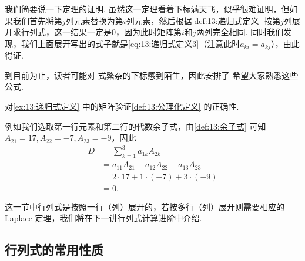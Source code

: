 我们简要说一下定理的证明. 虽然这一定理看着下标满天飞，似乎很难证明，但如果我们首先将第$j$列元素替换为第$i$列元素，然后根据\autoref{def:13:递归式定义} 按第$j$列展开求行列式，这一结果一定是0，因为此时矩阵第$i$和$j$两列完全相同. 同时我们发现，我们上面展开写出的式子就是\autoref{eq:13:递归式定义3}（注意此时$a_{ki}=a_{kj}$），由此得证.

到目前为止，读者可能对 式繁杂的下标感到陌生，因此安排了 希望大家熟悉这些公式.
\begin{example} \label{ex:13:递归式定义2}
    对\autoref{ex:13:递归式定义} 中的矩阵验证\autoref{def:13:公理化定义} 的正确性.
\end{example}

\begin{solution}
    例如我们选取第一行元素和第二行的代数余子式，由\autoref{def:13:余子式} 可知$A_{21}=17,A_{22}=-7,A_{23}=-9$，因此
    \begin{align*}
        D & =\sum_{k=1}^{3}a_{1k}A_{2k}             \\
          & =a_{11}A_{21}+a_{12}A_{22}+a_{13}A_{23} \\
          & =2 \cdot 17+1 \cdot (-7)+3 \cdot (-9)   \\
          & =0.
    \end{align*}
\end{solution}

这一节中行列式是按照一行（列）展开的，若按多行（列）展开则需要相应的 Laplace 定理，我们将在下一讲行列式计算进阶中介绍.

\subsection{行列式的常用性质}

